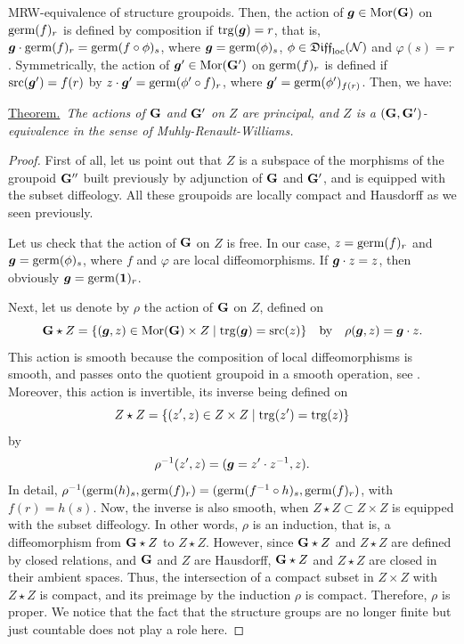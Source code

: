 \begin{Article}{MRW-equivalence of structure groupoids.}{}
  Then,
  the action of ${\boldsymbol g} \in {\operatorname{Mor}}({\mathbf G})$ on $\operatorname{germ}(f)_r$ is defined by composition if $\mathrm{trg}({\boldsymbol g})=r$,
  that is,
  ${\boldsymbol g} \cdot \operatorname{germ}(f)_r = \operatorname{germ}(f \circ \phi)_s$,
  where ${\boldsymbol g} = \operatorname{germ}(\phi)_s$,
  $\phi \in \mathfrak{Diff}_{\mathrm{loc}}(\mathcal{N})$ and $\varphi(s) = r$.
  Symmetrically,
  the action of ${\boldsymbol g}' \in {\operatorname{Mor}}({\mathbf G}')$ on $\operatorname{germ}(f)_r$ is defined if $\mathrm{src}({\boldsymbol g}')=f(r)$ by $z \cdot {\boldsymbol g}' = \operatorname{germ}(\phi' \circ f)_r$,
  where ${\boldsymbol g}' = \operatorname{germ}(\phi')_{f(r)}$.
  Then,
  we have:
  
  \uline{Theorem.}~{\itshape The actions of\/ ${\mathbf G}$ and ${\mathbf G}'$ on $Z$ are principal,
  and $Z$ is a $({\mathbf G},{\mathbf G}')$-equivalence in the sense of Muhly-Renault-Williams.}
\end{Article} %

\begin{proof}
  First of all,
  let us point out that $Z$ is a subspace of the morphisms of the groupoid ${\mathbf G}''$ built previously by adjunction of ${\mathbf G}$ and ${\mathbf G}'$,
  and is equipped with the subset diffeology.
  All these groupoids are locally compact and Hausdorff as we seen previously.
  
  Let us check that the action of ${\mathbf G}$ on $Z$ is free.
  In our case,
  $z=\operatorname{germ}(f)_r$ and ${\boldsymbol g} = \operatorname{germ}(\phi)_s$,
  where $f$ and $\varphi$ are local diffeomorphisms.
  If ${\boldsymbol g} \cdot z = z$,
  then obviously ${\boldsymbol g} = \operatorname{germ}({\mathbf{1}})_r$.
  
  Next,
  let us denote by $\rho$ the action of ${\mathbf G}$ on $Z$,
  defined on
  \[
    {\mathbf G} \star Z = \{({\boldsymbol g},z) \in {\operatorname{Mor}}({\mathbf G}) \times Z \mid \mathrm{trg}({\boldsymbol g})=\mathrm{src}(z)\} \quad \text{by} \quad \rho({\boldsymbol g},z) = {\boldsymbol g} \cdot z.
    \]
  This action is smooth because the composition of local diffeomorphisms is smooth,
  and passes onto the quotient groupoid in a smooth operation, see \cite[\textsection\,3]{IZL18}.
  Moreover, this action is invertible,
  its inverse being defined on
  \[
    Z \star Z = \{(z',z) \in Z \times Z \mid \mathrm{trg}(z')=\mathrm{trg}(z)\}
    \]
  by
  \[
    \rho^{-1}(z',z) = ({\boldsymbol g}=z' \cdot z^{-1},z).
    \]
  In detail,
  $\rho^{-1}(\operatorname{germ}(h)_s, \operatorname{germ}(f)_r) = (\operatorname{germ}(f^{-1} \circ h)_s,\operatorname{germ}(f)_r)$,
  with $f(r)=h(s)$.
  Now,
  the inverse is also smooth,
  when $Z \star Z \subset Z \times Z$ is equipped with the subset diffeology.
  In other words,
  $\rho$ is an induction,
  that is,
  a diffeomorphism from ${\mathbf G} \star Z$ to $Z \star Z$.
  However,
  since ${\mathbf G} \star Z$ and $Z \star Z$ are defined by closed relations,
  and ${\mathbf G}$ and $Z$ are Hausdorff,
  ${\mathbf G} \star Z$ and $Z \star Z$ are closed in their ambient spaces.
  Thus,
  the intersection of a compact subset in $Z \times Z$ with $Z \star Z$ is compact,
  and its preimage by the induction $\rho$ is compact.
  Therefore,
  $\rho$ is proper.
  We notice that the fact that the structure groups are no longer finite but just countable does not play a role here.
  

\end{proof}
